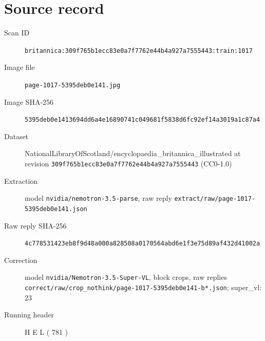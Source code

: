 \documentclass{article}
\begin{document}
\section*{Source record}
\begin{description}
\item[Scan ID] \texttt{britannica:309f765b1ecc83e0a7f7762e44b4a927a7555443:train:1017}
\item[Image file] \texttt{page-1017-5395deb0e141.jpg}
\item[Image SHA-256] \texttt{5395deb0e1413694dd6a4e16890741c049681f5838d6fc92ef14a3019a1c87a4}
\item[Dataset] NationalLibraryOfScotland/encyclopaedia\_britannica\_illustrated at revision \texttt{309f765b1ecc83e0a7f7762e44b4a927a7555443} (CC0-1.0)
\item[Extraction] model \texttt{nvidia/nemotron-3.5-parse}, raw reply \texttt{extract/raw/page-1017-5395deb0e141.json}
\item[Raw reply SHA-256] \texttt{4c778531423eb8f9d48a000a828508a0170564abd6e1f3e75d89af432d41002a}
\item[Correction] model \texttt{nvidia/Nemotron-3.5-Super-VL}, block crops, raw replies \texttt{correct/raw/crop\_nothink/page-1017-5395deb0e141-b*.json}; super\_vl: 23
\item[Running header] H E L ( 781 )
\end{description}
\end{document}
